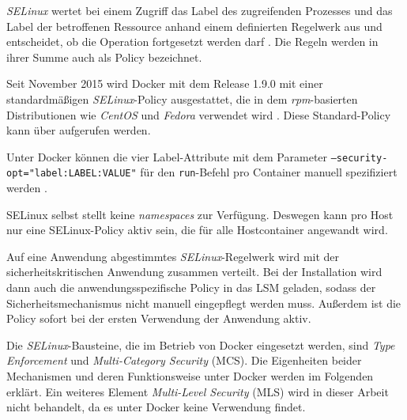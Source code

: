 \documentclass[../main.tex]{subfiles}
\begin{document}


				\emph{SELinux} wertet bei einem Zugriff das Label des zugreifenden Prozesses und das Label der betroffenen Ressource anhand einem definierten Regelwerk aus und entscheidet, ob die Operation fortgesetzt werden darf \cite{linuxSecOverview}. Die Regeln werden in ihrer Summe auch als Policy bezeichnet.

				Seit November 2015 wird Docker mit dem Release 1.9.0 mit einer standardmäßigen \emph{SELinux}-Policy ausgestattet, die in dem \emph{rpm}-basierten Distributionen wie \emph{CentOS} und \emph{Fedora} verwendet wird \cite{githubDockerChangelog}\cite{githubSELinuxPolicyIssue}. Diese Standard-Policy kann über \cite{githubSELinuxProfile} aufgerufen werden.

				Unter Docker können die vier Label-Attribute mit dem Parameter \texttt{--security-opt="label:LABEL:VALUE"} für den \texttt{run}-Befehl pro Container manuell spezifiziert werden \cite{dockerRun}.


				SELinux selbst stellt keine \emph{namespaces} zur Verfügung. Deswegen kann pro Host nur eine SELinux-Policy aktiv sein, die für alle Hostcontainer angewandt wird.

				Auf eine Anwendung abgestimmtes \emph{SELinux}-Regelwerk wird mit der sicherheitskritischen Anwendung zusammen verteilt. Bei der Installation wird dann auch die anwendungsspezifische Policy in das LSM geladen, sodass der Sicherheitsmechanismus nicht manuell eingepflegt werden muss. Außerdem ist die Policy sofort bei der ersten Verwendung der Anwendung aktiv.

				Die \emph{SELinux}-Bausteine, die im Betrieb von Docker eingesetzt werden, sind \emph{Type Enforcement} und \emph{Multi-Category Security} (MCS). Die Eigenheiten beider Mechanismen und deren Funktionsweise unter Docker werden im Folgenden erklärt. Ein weiteres Element \emph{Multi-Level Security} (MLS) wird in dieser Arbeit nicht behandelt, da es unter Docker keine Verwendung findet.
\end{document}
